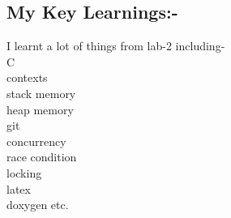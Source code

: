 \documentclass[12pt]{article}
\begin{document}
\begin{spacing}{1.2}
    \newpage

\section*{My Key Learnings:-}
I learnt a lot of things from lab-2 including- \\
C \\
contexts \\
stack memory \\
heap memory \\
git \\ concurrency \\ race condition \\ locking \\ latex \\doxygen etc.
    
\end{spacing}
\end{document}

